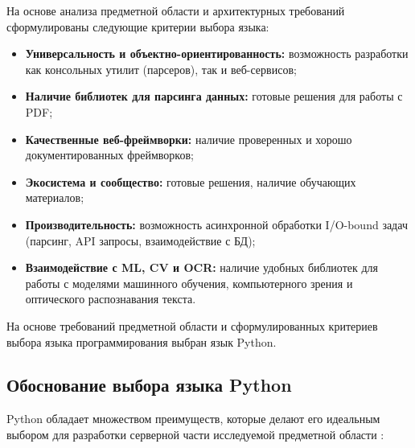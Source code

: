 На основе анализа предметной области и архитектурных требований сформулированы
следующие критерии выбора языка:

\begin{itemize}
	\item \textbf{Универсальность и объектно-ориентированность:} возможность разработки как консольных утилит (парсеров), так и веб-сервисов;
	\item \textbf{Наличие библиотек для парсинга данных:} готовые решения для работы с PDF;
	\item \textbf{Качественные веб-фреймворки:} наличие проверенных и хорошо документированных фреймворков;
	\item \textbf{Экосистема и сообщество:} готовые решения, наличие обучающих материалов;
	\item \textbf{Производительность:} возможность асинхронной обработки I/O-bound задач (парсинг, API запросы, взаимодействие с БД);
	\item \textbf{Взаимодействие с ML, CV и OCR:} наличие удобных библиотек для работы с моделями машинного обучения, компьютерного зрения и оптического распознавания текста.
\end{itemize}

На основе требований предметной области и сформулированных критериев выбора 
языка программирования выбран язык Python.

\subsection{Обоснование выбора языка Python}

Python обладает множеством преимуществ, которые делают его идеальным выбором для разработки серверной части исследуемой предметной области \cite{modern-python,solid-principles-article, indonesian}:

